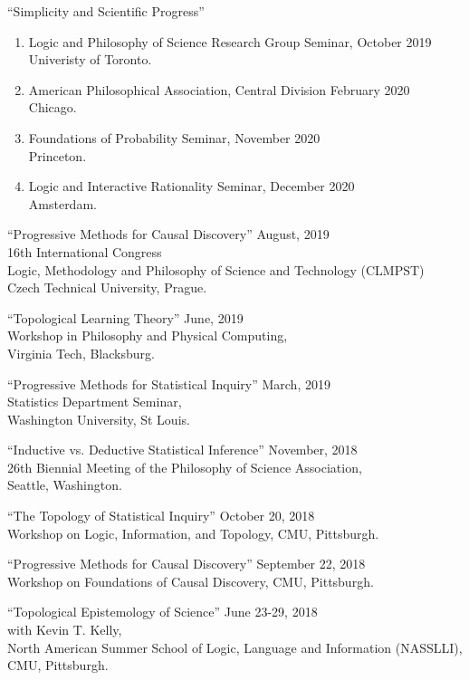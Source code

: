 \documentclass[12pt]{res} %
\begin{document}
\begin{resume}
``Simplicity and Scientific Progress''\\
\begin{enumerate}
\item Logic and Philosophy of Science Research Group Seminar, \hfill October 2019\\ Univeristy of Toronto. 
\item American Philosophical Association, Central Division \hfill February 2020\\ Chicago. 
\item Foundations of Probability Seminar, \hfill November 2020\\ Princeton. 
\item Logic and Interactive Rationality Seminar, \hfill December 2020\\ Amsterdam. 
\end{enumerate}

``Progressive Methods for Causal Discovery'' \hfill August, 2019\\
16th International Congress\\ Logic, Methodology and Philosophy of Science and Technology (CLMPST)\\
Czech Technical University, Prague.

``Topological Learning Theory'' \hfill June, 2019\\
Workshop in Philosophy and Physical Computing,\\
Virginia Tech, Blacksburg.

``Progressive Methods for Statistical Inquiry'' \hfill March, 2019\\
Statistics Department Seminar,\\
Washington University, St Louis. 

``Inductive vs. Deductive Statistical Inference'' \hfill November, 2018\\
26th Biennial Meeting of the Philosophy of Science Association,\\
Seattle, Washington.

``The Topology of Statistical Inquiry'' \hfill October 20, 2018\\
Workshop on Logic, Information, and Topology,
CMU, Pittsburgh.

``Progressive Methods for Causal Discovery'' \hfill September 22, 2018\\
Workshop on Foundations of Causal Discovery,
CMU, Pittsburgh.

``Topological Epistemology of Science'' \hfill June 23-29, 2018\\
with Kevin T. Kelly,\\
North American Summer School of Logic, Language and Information (NASSLLI),\\
CMU, Pittsburgh.


\end{resume}
\end{document}
